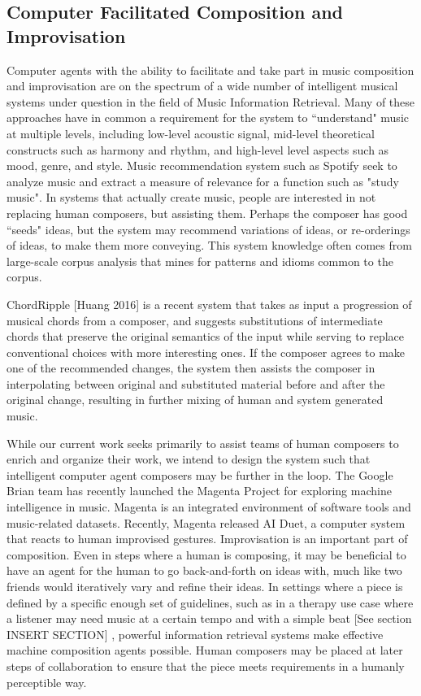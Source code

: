 \documentclass[final,authoryear,11pt,times]{elsarticle}
\begin{document}
\subsection{Computer Facilitated Composition and Improvisation}

Computer agents with the ability to facilitate and take part in music composition and improvisation are on the spectrum of a wide number of intelligent musical systems under question in the field of Music Information Retrieval. Many of these approaches have in common a requirement for the system to ``understand" music at multiple levels, including low-level acoustic signal, mid-level theoretical constructs such as harmony and rhythm, and high-level level aspects such as mood, genre, and style. Music recommendation system such as Spotify seek to analyze music and extract a measure of relevance for a function such as "study music". In systems that actually create music, people are interested in not replacing human composers, but assisting them. Perhaps the composer has good ``seeds" ideas, but the system may recommend variations of ideas, or re-orderings of ideas, to make them more conveying. This system knowledge often comes from large-scale corpus analysis that mines for patterns and idioms common to the corpus.

ChordRipple [Huang 2016] is a recent system that takes as input a progression of musical chords from a composer, and suggests substitutions of intermediate chords that preserve the original semantics of the input while serving to replace conventional choices with more interesting ones. If the composer agrees to make one of the recommended changes, the system then assists the composer in interpolating between original and substituted material before and after the original change, resulting in further mixing of human and system generated music.

While our current work seeks primarily to assist teams of human composers to enrich and organize their work, we intend to design the system such that intelligent computer agent composers may be further in the loop. The Google Brian team has recently launched the Magenta Project for exploring machine intelligence in music. Magenta is an integrated environment of software tools and music-related datasets. Recently, Magenta released AI Duet, a computer system that reacts to human improvised gestures. Improvisation is an important part of composition. Even in steps where a human is composing, it may be beneficial to have an agent for the human to go back-and-forth on ideas with, much like two friends would iteratively vary and refine their ideas. In settings where a piece is defined by a specific enough set of guidelines, such as in a therapy use case where a listener may need music at a certain tempo and with a simple beat [See section INSERT SECTION] , powerful information retrieval systems make effective machine composition agents possible. Human composers may be placed at later steps of collaboration to ensure that the piece meets requirements in a humanly perceptible way.
\end{document}

